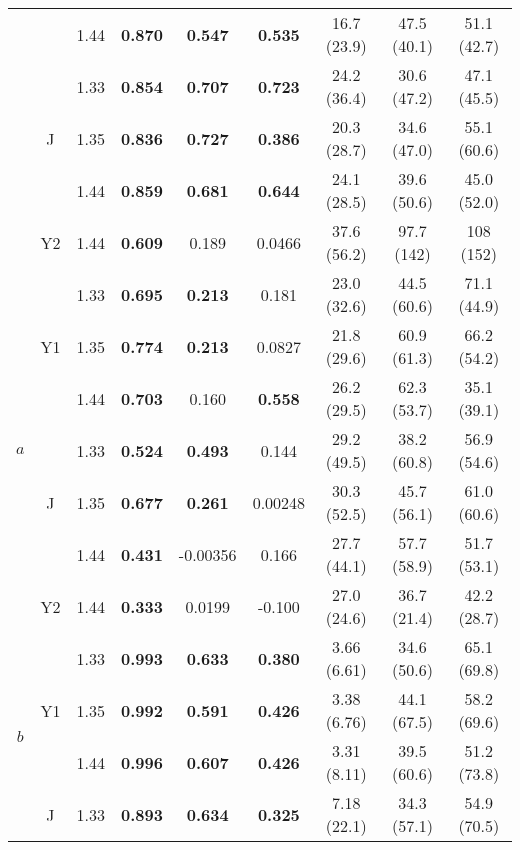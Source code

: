 \begin{table}[htb!]
\begin{tabular}{|ccc|ccc|ccc|}
        & & 1.44 & \textbf{0.870} & \textbf{0.547} & \textbf{0.535} & 16.7 (23.9) & 47.5 (40.1) & 51.1 (42.7)\\
        \cline{2-9}
        & \multirow{3}{*}{J} & 1.33 & \textbf{0.854} & \textbf{0.707} & \textbf{0.723} & 24.2 (36.4) & 30.6 (47.2) & 47.1 (45.5) \\
        & & 1.35 & \textbf{0.836} & \textbf{0.727} & \textbf{0.386} & 20.3 (28.7) & 34.6 (47.0) & 55.1 (60.6) \\
        & & 1.44 & \textbf{0.859} & \textbf{0.681} & \textbf{0.644} & 24.1 (28.5) & 39.6 (50.6) & 45.0 (52.0) \\
        \cline{2-9}
        & Y2 & 1.44 & \textbf{0.609} & 0.189 & 0.0466 & 37.6 (56.2) & 97.7 (142) & 108 (152) \\
        \hline
        \multirow{7}{*}{$a$} & \multirow{3}{*}{Y1} & 1.33 & \textbf{0.695} & \textbf{0.213} & 0.181 & 23.0 (32.6) & 44.5 (60.6) & 71.1 (44.9) \\
        & & 1.35 & \textbf{0.774} & \textbf{0.213} & 0.0827 & 21.8 (29.6) & 60.9 (61.3) & 66.2 (54.2) \\
        & & 1.44 & \textbf{0.703} & 0.160 & \textbf{0.558} & 26.2 (29.5) & 62.3 (53.7) & 35.1 (39.1) \\
        \cline{2-9}
        & \multirow{3}{*}{J} & 1.33 & \textbf{0.524} & \textbf{0.493} & 0.144 & 29.2 (49.5) & 38.2 (60.8) & 56.9 (54.6) \\
        & & 1.35 & \textbf{0.677} & \textbf{0.261} & 0.00248 & 30.3 (52.5) & 45.7 (56.1) & 61.0 (60.6) \\
        & & 1.44 & \textbf{0.431} & -0.00356 & 0.166 & 27.7 (44.1) & 57.7 (58.9) & 51.7 (53.1) \\
        \cline{2-9}
        & Y2 & 1.44 & \textbf{0.333} & 0.0199 & -0.100 & 27.0 (24.6) & 36.7 (21.4) & 42.2 (28.7) \\
        \hline
        \multirow{9}{*}{$b$} & \multirow{3}{*}{Y1} & 1.33 & \textbf{0.993} & \textbf{0.633} & \textbf{0.380} & 3.66 (6.61) & 34.6 (50.6) & 65.1 (69.8) \\
        & & 1.35 & \textbf{0.992} & \textbf{0.591} & \textbf{0.426} & 3.38 (6.76) & 44.1 (67.5) & 58.2 (69.6) \\
        & & 1.44 & \textbf{0.996} & \textbf{0.607} & \textbf{0.426} & 3.31 (8.11) & 39.5 (60.6) & 51.2 (73.8) \\
        \cline{2-9}
        & \multirow{3}{*}{J} & 1.33 & \textbf{0.893} & \textbf{0.634} & \textbf{0.325} & 7.18 (22.1) & 34.3 (57.1) & 54.9 (70.5) \\

\end{tabular}
\end{table}
